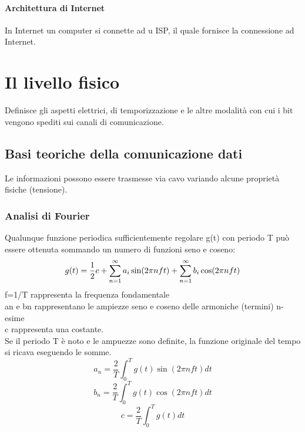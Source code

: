 \documentclass{article}
\begin{document}
		\paragraph{Architettura di Internet} In Internet un computer si connette ad u ISP, il quale fornisce la connessione ad Internet. 
		\newpage
		\section{Il livello fisico}
		Definisce gli aspetti elettrici, di temporizzazione e le altre modalità con cui i bit vengono spediti sui canali di comunicazione.\\
		\subsection{Basi teoriche della comunicazione dati}
		Le informazioni possono essere trasmesse via cavo variando alcune proprietà fisiche (tensione).
		\subsubsection{Analisi di Fourier}
		Qualunque funzione periodica sufficientemente regolare g(t) con periodo T può essere ottenuta sommando un numero di funzioni seno e coseno: \\
		\begin{equation}
			g(t) = \frac{1}{2}c+\sum_{n=1}^\infty a_i\sin (2\pi nft)+\sum_{n=1}^\infty b_i\cos (2\pi nft)\\
		\end{equation}
		f=1/T rappresenta la frequenza fondamentale \\ 
		a\ped n e b\ped n rappresentano le ampiezze seno e coseno delle armoniche (termini) n-esime\\
		c rappresenta una costante.\\
		Se il periodo T è noto e le ampuezze sono definite, la funzione originale del tempo si ricava eseguendo le somme.\\
				\begin{equation}
			a_n=\frac{2}{T} \int_{0}^{T}g(t)\sin (2\pi nft) dt			
		\end{equation}
		\begin{equation}
			b_n=\frac{2}{T} \int_{0}^{T}g(t)\cos(2\pi nft)dt
		\end{equation}
		\begin{equation}
			c=\frac{2}{T} \int_{0}^{T}g(t)dt
		\end{equation}
\end{document}
